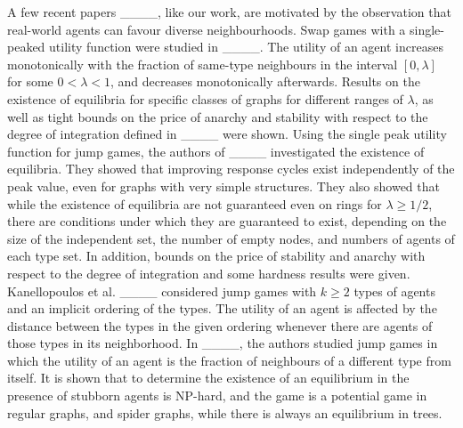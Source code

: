  A few recent papers  ____,
like our work, are motivated by the observation that real-world agents 
can favour diverse neighbourhoods. Swap games with a single-peaked utility function were studied in ____. The utility of an agent  increases monotonically with the fraction of
 same-type neighbours in the interval $[0, \lambda]$ for some $0<\lambda<1$, and decreases monotonically afterwards. Results on the existence of equilibria for specific classes of graphs for different ranges of $\lambda$, as well as tight bounds on the price of anarchy and stability with respect to the degree of integration defined in ____ were shown. 
Using the  single peak utility function for jump games, the authors of ____ investigated the existence of equilibria. 
They showed that improving response cycles exist independently of the peak value,
 even for graphs with very simple structures. They also showed that while the existence of equilibria are not guaranteed  even on rings for $\lambda\geq 1/2$, there are  conditions under which they are guaranteed to exist, depending on the size  of the independent set, the number of empty nodes, and numbers of agents of each type set.
In addition, bounds on the price of stability and anarchy with respect to the degree of integration and some hardness results were given. 
Kanellopoulos et al. ____ considered jump games with $k \geq 2$ types of agents and  an implicit ordering of the types.  The utility of an agent is affected by the distance between the types in the given ordering  whenever there are agents of those types in its neighborhood. 
In ____, the authors studied jump games in which the utility of an agent is the fraction of neighbours of a different type from itself.  It is shown that  to determine the existence of an equilibrium in the presence of stubborn agents is NP-hard, and the game is a potential game in regular graphs, and spider graphs, while there is always an equilibrium in trees.  











